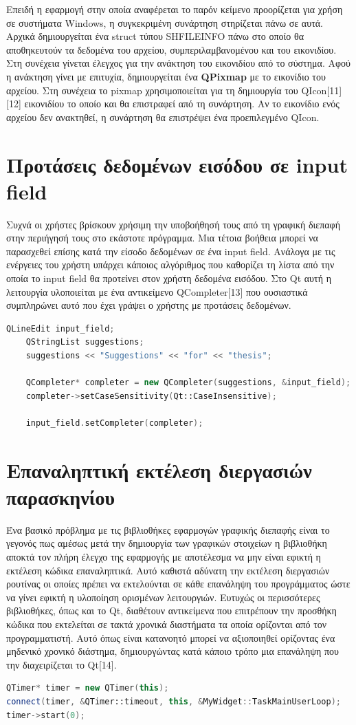 Επειδή η εφαρμογή στην οποία αναφέρεται το παρόν κείμενο προορίζεται για χρήση σε
συστήματα Windows, η συγκεκριμένη συνάρτηση στηρίζεται πάνω σε αυτά. Αρχικά
δημιουργείται ένα struct τύπου SHFILEINFO πάνω στο οποίο θα αποθηκευτούν τα
δεδομένα του αρχείου, συμπεριλαμβανομένου και του εικονιδίου. Στη συνέχεια γίνεται
έλεγχος για την ανάκτηση του εικονιδίου από το σύστημα. Αφού η ανάκτηση γίνει με
επιτυχία, δημιουργείται ένα \textbf{QPixmap} με το εικονίδιο του αρχείου. Στη 
συνέχεια το pixmap χρησιμοποιείται για τη δημιουργία του QIcon[11][12] εικονιδίου το
οποίο και θα επιστραφεί από τη συνάρτηση. Αν το εικονίδιο ενός αρχείου δεν ανακτηθεί, 
η συνάρτηση θα επιστρέψει ένα προεπιλεγμένο QIcon.


\section{Προτάσεις δεδομένων εισόδου σε input field}

Συχνά οι χρήστες βρίσκουν χρήσιμη την υποβοήθησή τους από τη γραφική διεπαφή
στην περιήγησή τους στο εκάστοτε πρόγραμμα. Μια τέτοια βοήθεια μπορεί να παρασχεθεί
επίσης κατά την είσοδο δεδομένων σε ένα input field. Ανάλογα με τις ενέργειες του
χρήστη υπάρχει κάποιος αλγόριθμος που καθορίζει τη λίστα από την οποία το
input field θα προτείνει στον χρήστη δεδομένα εισόδου. Στο Qt αυτή η λειτουργία
υλοποιείται με ένα αντικείμενο QCompleter[13] που ουσιαστικά συμπληρώνει αυτό που έχει
γράψει ο χρήστης με προτάσεις δεδομένων.

\begin{lstlisting}[language=C++, style=cppstyle]
    QLineEdit input_field;
    QStringList suggestions;
    suggestions << "Suggestions" << "for" << "thesis";
    
    QCompleter* completer = new QCompleter(suggestions, &input_field);
    completer->setCaseSensitivity(Qt::CaseInsensitive);
    
    input_field.setCompleter(completer);
\end{lstlisting}



\section{Επαναληπτική εκτέλεση διεργασιών παρασκηνίου}

Ένα βασικό πρόβλημα με τις βιβλιοθήκες εφαρμογών γραφικής διεπαφής είναι το γεγονός
πως αμέσως μετά την δημιουργία των γραφικών στοιχείων η βιβλιοθήκη αποκτά τον πλήρη
έλεγχο της εφαρμογής με αποτέλεσμα να μην είναι εφικτή η εκτέλεση κώδικα επαναληπτικά.
Αυτό καθιστά αδύνατη την εκτέλεση διεργασιών ρουτίνας οι οποίες πρέπει να εκτελούνται
σε κάθε επανάληψη του προγράμματος ώστε να γίνει εφικτή η υλοποίηση ορισμένων λειτουργιών.
Ευτυχώς οι περισσότερες βιβλιοθήκες, όπως και το Qt, διαθέτουν αντικείμενα που επιτρέπουν
την προσθήκη κώδικα που εκτελείται σε τακτά χρονικά διαστήματα τα οποία ορίζονται από τον
προγραμματιστή. Αυτό όπως είναι κατανοητό μπορεί να αξιοποιηθεί ορίζοντας ένα μηδενικό
χρονικό διάστημα, δημιουργώντας κατά κάποιο τρόπο μια επανάληψη που την διαχειρίζεται το
Qt[14].

 \begin{lstlisting}[language=C++, style=cppstyle]
QTimer* timer = new QTimer(this);
connect(timer, &QTimer::timeout, this, &MyWidget::TaskMainUserLoop);
timer->start(0);
\end{lstlisting}

